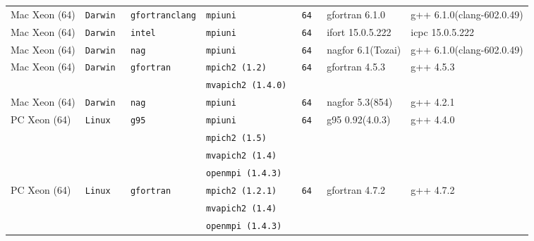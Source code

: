 \begin{longtable}{lllllll}
Mac Xeon (64)         &\tt Darwin &\tt \footnotesize gfortranclang&\tt mpiuni           &\tt 64           & gfortran \footnotesize 6.1.0        & g++ \footnotesize 6.1.0(clang-602.0.49) \\
Mac Xeon (64)         &\tt Darwin &\tt intel        &\tt mpiuni           &\tt 64           & ifort \footnotesize 15.0.5.222      & icpc \footnotesize 15.0.5.222     \\
Mac Xeon (64)         &\tt Darwin &\tt nag          &\tt mpiuni           &\tt 64           & nagfor \footnotesize 6.1(Tozai)     & g++ \footnotesize 6.1.0(clang-602.0.49) \\
Mac Xeon (64)         &\tt Darwin &\tt gfortran     &\tt mpich2 (1.2)     &\tt 64           & gfortran \footnotesize 4.5.3        & g++ \footnotesize 4.5.3           \\
                      &           &                 &\tt mvapich2 (1.4.0) &                 &                                     &                                   \\
Mac Xeon (64)         &\tt Darwin &\tt nag          &\tt mpiuni           &\tt 64           & nagfor \footnotesize 5.3(854)       & g++ \footnotesize 4.2.1           \\
PC Xeon (64)          &\tt Linux  &\tt g95          &\tt mpiuni           &\tt 64           & g95 \footnotesize 0.92(4.0.3)       & g++  \footnotesize 4.4.0          \\
                      &           &                 &\tt mpich2 (1.5)     &                 &                                     &                                   \\
                      &           &                 &\tt mvapich2 (1.4)   &                 &                                     &                                   \\
                      &           &                 &\tt openmpi (1.4.3)  &                 &                                     &                                   \\
PC Xeon (64)          &\tt Linux  &\tt gfortran     &\tt mpich2 (1.2.1)   &\tt 64           & gfortran \footnotesize 4.7.2        & g++  \footnotesize 4.7.2          \\
                      &           &                 &\tt mvapich2 (1.4)   &                 &                                     &                                   \\
                      &           &                 &\tt openmpi (1.4.3)  &                 &                                     &                                   \\

\end{longtable}
